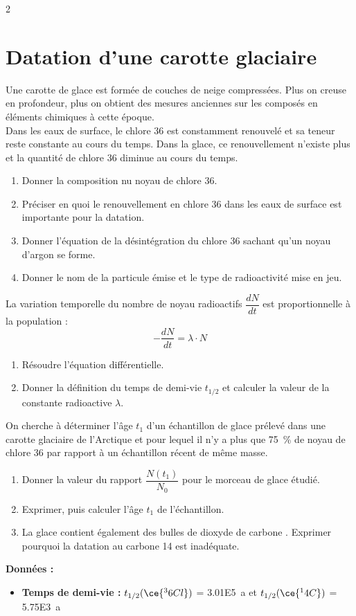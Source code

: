 \documentclass[a4paper,11pt,fleqn]{article}%
\begin{document}
\begin{multicols}{2}
\section{Datation d'une carotte glaciaire}
Une carotte de glace est formée de couches de neige compressées. Plus on creuse en profondeur, plus on obtient des mesures anciennes sur les composés en éléments chimiques à cette époque.\\
Dans les eaux de surface, le chlore 36 est constamment renouvelé et sa teneur reste constante au cours du temps. Dans la glace, ce renouvellement n'existe plus et la quantité de chlore 36 diminue au cours du temps.
\begin{enumerate}
	\item Donner la composition nu noyau de chlore 36.
	\item Préciser en quoi le renouvellement en chlore 36 dans les eaux de surface est importante pour la datation.
	\item Donner l'équation de la désintégration du chlore 36 sachant qu'un noyau d'argon se forme.
	\item Donner le nom de la particule émise et le type de radioactivité mise en jeu.
\end{enumerate}
La variation temporelle du nombre de noyau radioactifs $\dfrac{dN}{dt}$ est proportionnelle à la population : $$-\dfrac{dN}{dt}=\lambda \cdot N$$
\begin{enumerate}[resume]
	\item Résoudre l'équation différentielle.
	\item Donner la définition du temps de demi-vie $t_{1/2}$ et calculer la valeur de la constante radioactive $\lambda$.
\end{enumerate}
On cherche à déterminer l'âge $t_1$ d'un échantillon de glace prélevé dans une carotte glaciaire de l'Arctique et pour lequel il n'y a plus que \SI{75}{\percent} de noyau de chlore 36 par rapport à un échantillon récent de même masse.
\begin{enumerate}[resume]
	\item Donner la valeur du rapport $\dfrac{N(t_1)}{N_0}$ pour le morceau de glace étudié.
	\item Exprimer, puis calculer l'âge $t_1$ de l'échantillon.
	\item La glace contient également des bulles de dioxyde de carbone . Exprimer pourquoi la datation au carbone 14 est inadéquate.
\end{enumerate}
\textbf{Données :}
\begin{itemize}
	\item \textbf{Temps de demi-vie :} $t_{1/2}(\ce{^36 Cl})$ = \SI{3.01E5}{a} et $t_{1/2}(\ce{^14 C})$ = \SI{5.75E3}{a}
\end{itemize}
\end{multicols}
\end{document}

